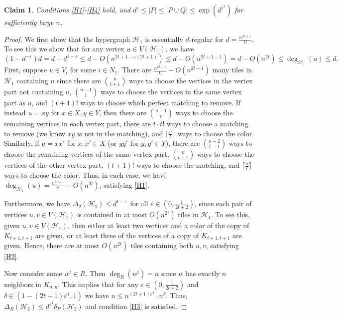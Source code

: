 \documentclass{article}
\newtheorem{claim}[theorem]{Claim}
\theoremstyle{definition}
\newcommand\cH{{\mathcal H}}
\begin{document}
\begin{claim}
Conditions \ref{H1}-\ref{H4} hold,
    and $d^\varepsilon \leq |P| \leq |P \cup Q| \leq \exp(d^{\varepsilon^3})$ for sufficiently large $n$.
\end{claim}
\begin{proof}
We first show that the hypergraph $\cH_1$ is essentially $d$-regular for $d = \frac{n^{2t+1}}{t!}$. To see this we show that for any vertex $u \in V(\cH_1)$, we have $$(1-d^{-\varepsilon})d = d - d^{1-\varepsilon} \leq d- O \left(n^{2t+1 - \varepsilon (2t+1)} \right) \leq d- O \left(n^{2t+1 - 1} \right) = d - O(n^{2t}) \leq \deg_{\cH_1} (u) \leq d.$$  First, suppose $u \in V_i$ for some $i\in N_1$.  There are $\frac{n^{2t+1}}{t!} - O(n^{2t-1})$ many tiles in $\cH_1$ containing $u$ since there are $\binom{n}{t+1}$ ways to choose the vertices in the vertex part not containing $u$, $\binom{n-1}{t}$ ways to choose the vertices in the same vertex part as $u$, and $(t+1)!$ ways to choose which perfect matching to remove. If instead $u = xy$ for $x \in X, y \in Y$, then there are $\binom{n-1}{t}$ ways to choose the remaining vertices in each vertex part, there are $t \cdot t!$ ways to choose a matching to remove (we know $xy$ is not in the matching), and $\lceil \frac{n}{t}\rceil$ ways to choose the color. Similarly, if $u = xx'$ for $x,x' \in X$ (or $yy'$ for $y,y' \in Y$), there are $\binom{n-2}{t-1}$ ways to choose the remaining vertices of the same vertex part, $\binom{n}{t+1}$ ways to choose the vertices of the other vertex part, $(t+1)!$ ways to choose the matching, and $\lceil \frac{n}{t}\rceil$ ways to choose the color. Thus, in each case, we have $\deg_{\cH_1} (u) = \frac{n^{2t+1}}{t!} - O(n^{2t})$, satisfying \ref{H1}.




    Furthermore, we have $\Delta_2 (\cH_1) \leq d^{1- \varepsilon}$ for all $\varepsilon \in (0,\frac{1}{2t+2})$, since each pair of vertices $u,v \in V(\cH_1)$ is contained in at most $O(n^{2t})$ tiles in $\cH_1$.  To see this, given $u,v \in V(\cH_1)$, then either at least two vertices and a color of the copy of $K_{t+1,t+1}$ are given, or at least three of the vertices of a copy of $K_{t+1,t+1}$ are given.  Hence, there are at most $O(n^{2t})$ tiles containing both $u,v$, satisfying \ref{H2}.

    Now consider some $w^i\in R$. Then $\deg_R(w^i) = n$ since $w$ has exactly $n$ neighbors in $K_{n,n}$. This implies that for any $\varepsilon \in (0,\frac{1}{2t+2})$ and $\delta \in (1-(2t+1)\varepsilon^4,1)$ we have $n \leq n^{(2t+1)\varepsilon^4}\cdot n^{\delta}$. Thus, $\Delta_R(\mathcal{H}_2)\leq d^{\varepsilon^4}\delta_P(\mathcal{H}_2)$ and condition \ref{H3} is satisfied.



\end{proof}
\end{document}
